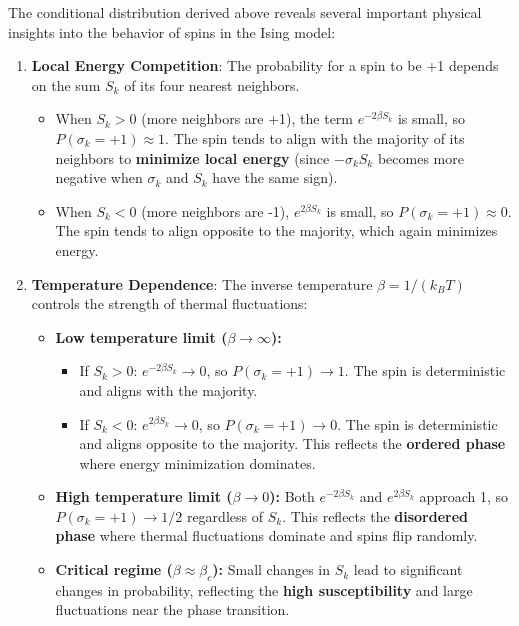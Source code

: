 \documentclass[11pt]{article}
\providecommand{\tightlist}{%
      \setlength{\itemsep}{0pt}\setlength{\parskip}{0pt}}
\begin{document}
The conditional distribution derived above reveals several important
physical insights into the behavior of spins in the Ising model:

\begin{enumerate}
\def\labelenumi{\arabic{enumi}.}
\tightlist
\item
  \textbf{Local Energy Competition}: The probability for a spin to be +1
  depends on the sum \(S_k\) of its four nearest neighbors.

  \begin{itemize}
  \tightlist
  \item
    When \(S_k > 0\) (more neighbors are +1), the term
    \(e^{-2\beta S_k}\) is small, so \(P(\sigma_k = +1) \approx 1\). The
    spin tends to align with the majority of its neighbors to
    \textbf{minimize local energy} (since \(-\sigma_k S_k\) becomes more
    negative when \(\sigma_k\) and \(S_k\) have the same sign).
  \item
    When \(S_k < 0\) (more neighbors are -1), \(e^{2\beta S_k}\) is
    small, so \(P(\sigma_k = +1) \approx 0\). The spin tends to align
    opposite to the majority, which again minimizes energy.
  \end{itemize}
\item
  \textbf{Temperature Dependence}: The inverse temperature
  \(\beta = 1/(k_B T)\) controls the strength of thermal fluctuations:

  \begin{itemize}
  \item
    \textbf{Low temperature limit (\(\beta \to \infty\)):}

    \begin{itemize}
    \tightlist
    \item
      If \(S_k > 0\): \(e^{-2\beta S_k} \to 0\), so
      \(P(\sigma_k = +1) \to 1\). The spin is deterministic and aligns
      with the majority.
    \item
      If \(S_k < 0\): \(e^{2\beta S_k} \to 0\), so
      \(P(\sigma_k = +1) \to 0\). The spin is deterministic and aligns
      opposite to the majority. This reflects the \textbf{ordered phase}
      where energy minimization dominates.
    \end{itemize}
  \item
    \textbf{High temperature limit (\(\beta \to 0\)):} Both
    \(e^{-2\beta S_k}\) and \(e^{2\beta S_k}\) approach 1, so
    \(P(\sigma_k = +1) \to 1/2\) regardless of \(S_k\). This reflects
    the \textbf{disordered phase} where thermal fluctuations dominate
    and spins flip randomly.
  \item
    \textbf{Critical regime (\(\beta \approx \beta_c\)):} Small changes
    in \(S_k\) lead to significant changes in probability, reflecting
    the \textbf{high susceptibility} and large fluctuations near the
    phase transition.
  \end{itemize}
\end{enumerate}
\end{document}
